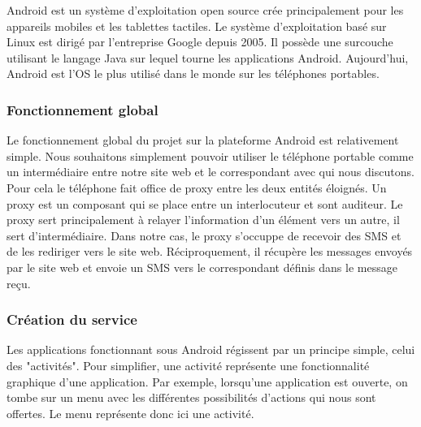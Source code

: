 Android est un système d'exploitation open source crée principalement pour les appareils mobiles et 
les tablettes tactiles. Le système d'exploitation basé sur Linux est dirigé par l'entreprise Google
depuis 2005. Il possède une surcouche utilisant le langage Java sur lequel tourne les applications 
Android.
Aujourd'hui, Android est l'OS le plus utilisé dans le monde sur les téléphones portables.



\subsubsection{Fonctionnement global}



Le fonctionnement global du projet sur la plateforme Android est relativement simple. Nous souhaitons
simplement pouvoir utiliser le téléphone portable comme un intermédiaire entre notre site web et le 
correspondant avec qui nous discutons. Pour cela le téléphone fait office de proxy entre les deux 
entités éloignés. Un proxy est un composant qui se place entre un interlocuteur et sont auditeur. Le 
proxy sert principalement à relayer l'information d'un élément vers un autre, il sert d'intermédiaire.
Dans notre cas, le proxy s'occuppe de recevoir des SMS et de les rediriger vers le site web. 
Réciproquement, il récupère les messages envoyés par le site web et envoie un SMS vers le correspondant
définis dans le message reçu.



\subsubsection{Création du service}



Les applications fonctionnant sous Android régissent par un principe simple, celui des "activités".
Pour simplifier, une activité représente une fonctionnalité graphique d'une application. Par exemple,
lorsqu'une application est ouverte, on tombe sur un menu avec les différentes possibilités d'actions 
qui nous sont offertes. Le menu représente donc ici une activité. 
\\


